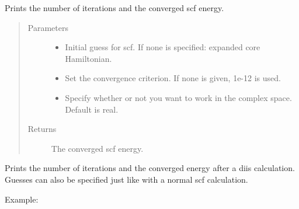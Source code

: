 \documentclass[letterpaper,10pt,english]{sphinxmanual}
\begin{document}
\begin{fulllineitems}

\begin{fulllineitems}
\label{\detokenize{GHF:ghf.GHF.GHF.get_scf_solution}}
Prints the number of iterations and the converged scf energy.
\begin{quote}\begin{description}
\item[{Parameters}] \leavevmode\begin{itemize}
\item {} 
 \textendash{} Initial guess for scf. If none is specified: expanded core Hamiltonian.

\item {} 
 \textendash{} Set the convergence criterion. If none is given, 1e-12 is used.

\item {} 
 \textendash{} Specify whether or not you want to work in the complex space. Default is real.

\end{itemize}

\item[{Returns}] \leavevmode
The converged scf energy.

\end{description}\end{quote}

\end{fulllineitems}


\begin{fulllineitems}
\label{\detokenize{GHF:ghf.GHF.GHF.get_scf_solution_diis}}
Prints the number of iterations and the converged energy after a diis calculation. Guesses can also be specified
just like with a normal scf calculation.

Example:


\end{fulllineitems}
\end{fulllineitems}
\end{document}
